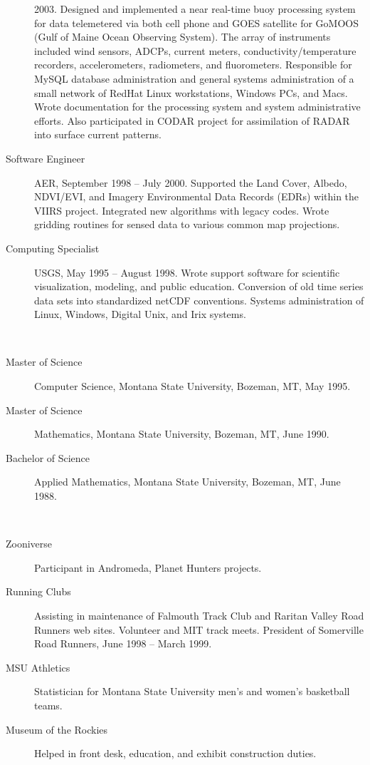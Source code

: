 \documentclass[11pt]{article}  %
\begin{document}
\begin{description}
    2003.  Designed and implemented a near real-time buoy processing
    system for data telemetered via both cell phone and GOES satellite
    for GoMOOS (Gulf of Maine Ocean Observing System).   The array
    of instruments included wind sensors, ADCPs, current meters,
    conductivity/temperature recorders, accelerometers, radiometers,
    and fluorometers.   Responsible for MySQL database administration
    and general systems administration of a small network of RedHat
    Linux workstations, Windows PCs, and Macs.   Wrote documentation
    for the processing system and system administrative efforts.
    Also participated in CODAR project for assimilation of RADAR into
    surface current patterns.
  \item[Software Engineer] AER, September 1998 -- July 2000.  Supported the
    Land Cover, Albedo, NDVI/EVI, and Imagery Environmental Data Records
    (EDRs) within the VIIRS project. Integrated new algorithms with
    legacy codes. Wrote gridding routines for sensed data to various
    common map projections.
  \item[Computing Specialist] USGS, May 1995 -- August 1998.  
    Wrote support software for scientific visualization, modeling, and
    public education. Conversion of old time series data sets into
    standardized netCDF conventions.  Systems administration of Linux,
    Windows, Digital Unix, and Irix systems.
\end{description}

\bigskip 
{}\\ 
\begin{description}
  \item[Master of Science] Computer Science, Montana State University, Bozeman,
    MT, May 1995.
  \item[Master of Science] Mathematics, Montana State University, Bozeman,
    MT, June 1990.
  \item[Bachelor of Science] Applied Mathematics, Montana State University,
    Bozeman, MT, June 1988.
\end{description}

\bigskip 
{}\\ 
\begin{description}
  \item[Zooniverse] Participant in Andromeda, Planet Hunters projects.
  \item[Running Clubs] Assisting in maintenance of Falmouth Track Club and
    Raritan Valley Road Runners web sites.  Volunteer and MIT track meets.
    President of Somerville Road Runners, June 1998 -- March 1999.
  \item[MSU Athletics] Statistician for Montana State University men's and
    women's basketball teams.
  \item[Museum of the Rockies] Helped in front desk, education, and exhibit
    construction duties.
\end{description}
\end{document}

